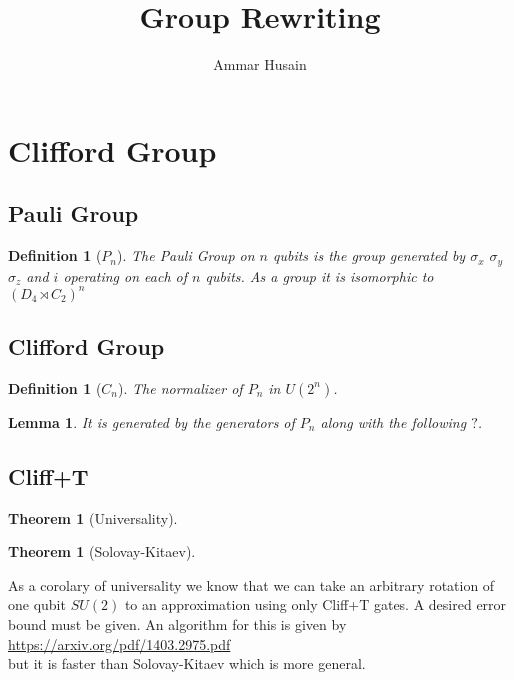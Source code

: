 \documentclass[11pt]{article}
\title{Group Rewriting}
\author{Ammar Husain}
\theoremstyle{change}
\newtheorem{definition}[equation]{Definition}
\newtheorem{theorem}[equation]{Theorem}
\newtheorem{lemma}[equation]{Lemma}
\theoremstyle{nonumberplain}
\numberwithin{equation}{section}
\begin{document}
\maketitle

\section{Clifford Group}

\subsection{Pauli Group}

\begin{definition}[$P_n$]
The Pauli Group on $n$ qubits is the group generated by $\sigma_x$ $\sigma_y$ $\sigma_z$ and $i$ operating on each of $n$ qubits. As a group it is isomorphic to $(D_4 \rtimes C_2)^n$
\end{definition}

\subsection{Clifford Group}

\begin{definition}[$C_n$]
The normalizer of $P_n$ in $U(2^n)$.
\end{definition}

\begin{lemma}
It is generated by the generators of $P_n$ along with the following $?$.
\end{lemma}

\subsection{Cliff+T}

\begin{theorem}[Universality]
\end{theorem}

\begin{theorem}[Solovay-Kitaev]
\end{theorem}

As a corolary of universality we know that we can take an arbitrary rotation of one qubit $SU(2)$ to an approximation using only Cliff+T gates. A desired error bound must be given. An algorithm for this is given by\\
\url{https://arxiv.org/pdf/1403.2975.pdf}\\
but it is faster than Solovay-Kitaev which is more general.
\end{document}
